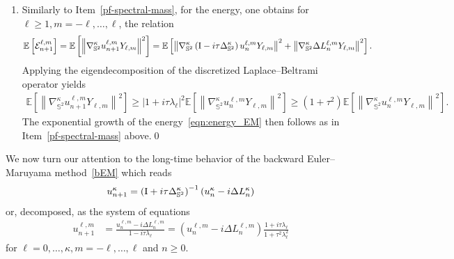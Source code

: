 \documentclass[11pt]{amsart}
\newcommand{\E}{{\mathbb E}}
\newcommand{\IS}{\mathbb{S}}
\newcommand{\Id}{\text I}
\newcommand{\cE}{\mathcal E}
\newcommand{\abs}[1]{\lvert #1 \rvert}
\providecommand{\norm}[1]{\left\lVert#1\right\rVert}
\newcommand{\Deltalb}{\Delta_{\IS^2}}
\newcommand{\nablalb}{\nabla_{\IS^{2}}}
\begin{document}
\begin{appendixproof}
\begin{enumerate}[label=\roman*)]
\item Similarly to Item~\ref{pf-spectral-mass}, for the energy, one obtains for $\ell \geq 1, m=-\ell, \dots, \ell$, the relation
    \begin{align*}
        \E\left[\cE^{\ell,m}_{n+1}\right] = \E\left[\norm{\nablalb^\kappa u_{n+1}^{\ell, m}Y_{\ell, m}}^2\right] = \E\left[\norm{\nablalb^\kappa \left(\Id - i\tau\Deltalb^\kappa\right)u_n^{\ell, m}Y_{\ell , m}}^2 + \norm{\nablalb^\kappa \Delta L_n^{\ell, m}Y_{\ell , m}}^2\right].
    \end{align*}
    Applying the eigendecomposition of the discretized Laplace--Beltrami operator yields
    \begin{align*}
        \E\left[\norm{\nablalb^\kappa u_{n+1}^{\ell, m}Y_{\ell, m}}^2\right] \geq \abs{1 + i\tau\lambda_\ell}^2\E\left[\norm{\nablalb^\kappa u_n^{\ell, m}Y_{\ell , m}}^2\right] \geq \left(1 + \tau^2\right)\E\left[\norm{\nablalb^\kappa u_n^{\ell, m}Y_{\ell , m}}^2\right].
    \end{align*}
    The exponential growth of the energy~\eqref{eqn:energy_EM} then follows as in Item~\ref{pf-spectral-mass} above.\qed
\end{enumerate}
\renewcommand{\qedsymbol}{}
\end{appendixproof}

We now turn our attention to the long-time behavior of the backward Euler--Maruyama method~\eqref{bEM} which reads
\begin{align}\label{eqn:BEM}
    u^\kappa_{n+1} = \left(\Id + i\tau \Deltalb^\kappa\right)^{-1}\left(u_n^\kappa - i\Delta L^\kappa_{n}\right)
\end{align}
or, decomposed, as the system of equations
\begin{align}\label{eqn:BEM_decomposed}
    u_{n+1}^{\ell, m} &= \frac{u_n^{\ell,m} - i\Delta L^{\ell, m}_n}{1 - i\tau \lambda_\ell} = \left(u_n^{\ell,m} - i\Delta L^{\ell, m}_n\right)\frac{1+i\tau\lambda_\ell}{1 + \tau^2 \lambda_\ell^2}
\end{align}
for $\ell = 0, \dots, \kappa, m = -\ell, \dots, \ell$ and $n \geq 0$.
\end{document}
